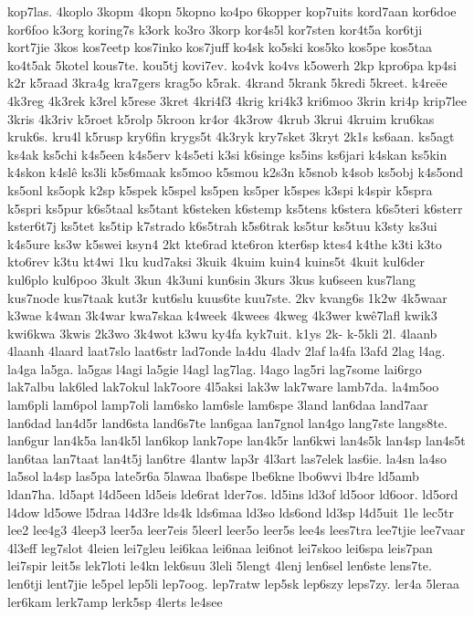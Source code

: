 {kop7las.
4koplo
3kopm
4kopn
5kopno
ko4po
6kopper
kop7uits
kord7aan
kor6doe
kor6foo
k3org
koring7s
k3ork
ko3ro
3korp
kor4s5l
kor7sten
kor4t5a
kor6tji
kort7jie
3kos
kos7eetp
kos7inko
kos7juff
ko4sk
ko5ski
kos5ko
kos5pe
kos5taa
ko4t5ak
5kotel
kous7te.
kou5tj
kovi7ev.
ko4vk
ko4vs
k5owerh
2kp
kpro6pa
kp4si
k2r
k5raad
3kra4g
kra7gers
krag5o
k5rak.
4krand
5krank
5kredi
5kreet.
k4reëe
4k3reg
4k3rek
k3rel
k5rese
3kret
4kri4f3
4krig
kri4k3
kri6moo
3krin
kri4p
krip7lee
3kris
4k3riv
k5roet
k5rolp
5kroon
kr4or
4k3row
4krub
3krui
4kruim
kru6kas
kruk6s.
kru4l
k5rusp
kry6fin
krygs5t
4k3ryk
kry7sket
3kryt
2k1s
ks6aan.
ks5agt
ks4ak
ks5chi
k4s5een
k4s5erv
k4s5eti
k3si
k6singe
ks5ins
ks6jari
k4skan
ks5kin
k4skon
k4slê
ks3li
k5s6maak
ks5moo
k5smou
k2s3n
k5snob
k4sob
ks5obj
k4s5ond
ks5onl
ks5opk
k2sp
k5spek
k5spel
ks5pen
ks5per
k5spes
k3spi
k4spir
k5spra
k5spri
ks5pur
k6s5taal
ks5tant
k6steken
k6stemp
ks5tens
k6stera
k6s5teri
k6sterr
kster6t7j
ks5tet
ks5tip
k7strado
k6s5trah
k5s6trak
ks5tur
ks5tuu
k3sty
ks3ui
k4s5ure
ks3w
k5swei
ksyn4
2kt
kte6rad
kte6ron
kter6sp
ktes4
k4the
k3ti
k3to
kto6rev
k3tu
kt4wi
1ku
kud7aksi
3kuik
4kuim
kuin4
kuins5t
4kuit
kul6der
kul6plo
kul6poo
3kult
3kun
4k3uni
kun6sin
3kurs
3kus
ku6seen
kus7lang
kus7node
kus7taak
kut3r
kut6slu
kuus6te
kuu7ste.
2kv
kvang6s
1k2w
4k5waar
k3wae
k4wan
3k4war
kwa7skaa
k4week
4kwees
4kweg
4k3wer
kwê7lafl
kwik3
kwi6kwa
3kwis
2k3wo
3k4wot
k3wu
ky4fa
kyk7uit.
k1ys
2k-
k-5kli
2l.
4laanb
4laanh
4laard
laat7slo
laat6str
lad7onde
la4du
4ladv
2laf
la4fa
l3afd
2lag
l4ag.
la4ga
la5ga.
la5gas
l4agi
la5gie
l4agl
lag7lag.
l4ago
lag5ri
lag7some
lai6rgo
lak7albu
lak6led
lak7okul
lak7oore
4l5aksi
lak3w
lak7ware
lamb7da.
la4m5oo
lam6pli
lam6pol
lamp7oli
lam6sko
lam6sle
lam6spe
3land
lan6daa
land7aar
lan6dad
lan4d5r
land6sta
land6s7te
lan6gaa
lan7gnol
lan4go
lang7ste
langs8te.
lan6gur
lan4k5a
lan4k5l
lan6kop
lank7ope
lan4k5r
lan6kwi
lan4s5k
lan4sp
lan4s5t
lan6taa
lan7taat
lan4t5j
lan6tre
4lantw
lap3r
4l3art
las7elek
las6ie.
la4sn
la4so
la5sol
la4sp
las5pa
late5r6a
5lawaa
lba6spe
lbe6kne
lbo6wvi
lb4re
ld5amb
ldan7ha.
ld5apt
l4d5een
ld5eis
lde6rat
lder7os.
ld5ins
ld3of
ld5oor
ld6oor.
ld5ord
l4dow
ld5owe
l5draa
l4d3re
lds4k
lds6maa
ld3so
lds6ond
ld3sp
l4d5uit
1le
lec5tr
lee2
lee4g3
4leep3
leer5a
leer7eis
5leerl
leer5o
leer5s
lee4s
lees7tra
lee7tjie
lee7vaar
4l3eff
leg7slot
4leien
lei7gleu
lei6kaa
lei6naa
lei6not
lei7skoo
lei6spa
leis7pan
lei7spir
leit5s
lek7loti
le4kn
lek6suu
3leli
5lengt
4lenj
len6sel
len6ste
lens7te.
len6tji
lent7jie
le5pel
lep5li
lep7oog.
lep7ratw
lep5sk
lep6szy
leps7zy.
ler4a
5leraa
ler6kam
lerk7amp
lerk5sp
4lerts
le4see
}
